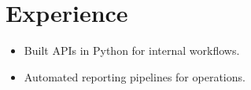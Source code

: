 \section{Experience}
\begin{itemize}
\item Built APIs in Python for internal workflows.
\item Automated reporting pipelines for operations.
\end{itemize}

